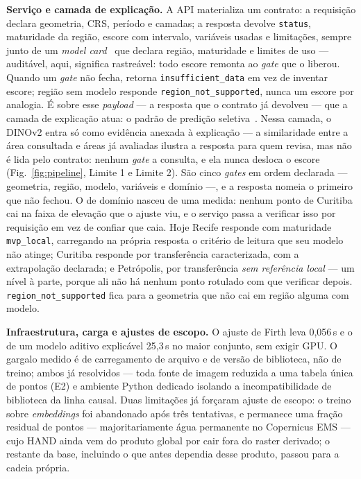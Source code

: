 \documentclass[conference]{IEEEtran}
\begin{document}
\textbf{Serviço e camada de explicação.} A API materializa um contrato: a
requisição declara geometria, CRS, período e camadas; a resposta devolve
\texttt{status}, maturidade da região, escore com intervalo, variáveis usadas e
limitações, sempre junto de um \emph{model card}~\cite{mitchell2019} que declara
região, maturidade e limites de uso --- auditável, aqui, significa rastreável:
todo escore remonta ao \emph{gate} que o liberou. Quando um \emph{gate} não
fecha, retorna \texttt{insufficient\_data} em vez de inventar escore; região sem
modelo responde \texttt{region\_not\_supported}, nunca um escore por analogia. É
sobre esse \emph{payload} --- a resposta que o contrato já devolveu --- que a
camada de explicação atua: o padrão de predição seletiva~\cite{mitchell2019}.
Nessa camada, o DINOv2 entra só como evidência anexada à explicação --- a
similaridade entre a área consultada e áreas já avaliadas ilustra a resposta
para quem revisa, mas não é lida pelo contrato: nenhum \emph{gate} a consulta,
e ela nunca desloca o escore (Fig.~\ref{fig:pipeline}, Limite 1 e Limite 2). São
cinco \emph{gates} em ordem declarada --- geometria, região, modelo, variáveis e
domínio ---, e a resposta nomeia o primeiro que não fechou. O de domínio nasceu
de uma medida: nenhum ponto de Curitiba cai na faixa de elevação que o ajuste
viu, e o serviço passa a verificar isso por requisição em vez de confiar que
caia. Hoje Recife responde com maturidade \texttt{mvp\_local}, carregando na
própria resposta o critério de leitura que seu modelo não atinge; Curitiba
responde por transferência caracterizada, com a extrapolação declarada; e
Petrópolis, por transferência \emph{sem referência local} --- um nível à parte,
porque ali não há nenhum ponto rotulado com que verificar depois.
\texttt{region\_not\_supported} fica para a geometria que não cai em região
alguma com modelo.

\textbf{Infraestrutura, carga e ajustes de escopo.} O ajuste de Firth leva
0,056\,s e o de um modelo aditivo explicável 25,3\,s no maior conjunto, sem
exigir GPU. O gargalo medido é de carregamento de arquivo e de
versão de biblioteca, não de treino; ambos já resolvidos --- toda fonte de
imagem reduzida a uma tabela única de pontos (E2) e ambiente Python dedicado
isolando a incompatibilidade de biblioteca da linha causal. Duas limitações já forçaram ajuste de escopo: o treino
sobre \emph{embeddings} foi abandonado após três tentativas, e permanece uma
fração residual de pontos --- majoritariamente água permanente no Copernicus
EMS --- cujo HAND ainda vem do produto global por cair fora do raster
derivado; o restante da base, incluindo o que antes dependia desse produto,
passou para a cadeia própria.
\end{document}
